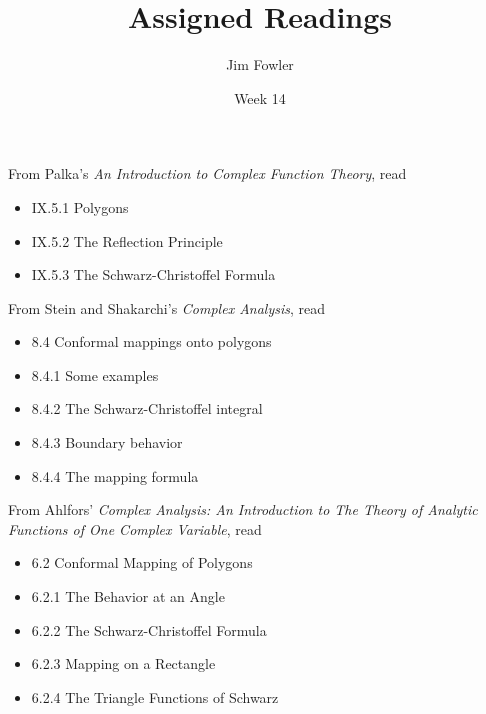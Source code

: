 \documentclass{homework}
\author{Jim Fowler}
\title{Assigned Readings}
\date{Week 14}
\begin{document}
\maketitle


From Palka's \textit{An Introduction to Complex Function Theory}, read
\begin{itemize}
\item IX.5.1 Polygons
\item IX.5.2 The Reflection Principle
\item IX.5.3 The Schwarz-Christoffel Formula
\end{itemize}

From Stein and Shakarchi's \textit{Complex Analysis}, read
\begin{itemize}
\item 8.4 Conformal mappings onto polygons
\item 8.4.1 Some examples
\item 8.4.2 The Schwarz-Christoffel integral
\item 8.4.3 Boundary behavior
\item 8.4.4 The mapping formula
\end{itemize}

From Ahlfors' \textit{Complex Analysis: An Introduction to The Theory of Analytic Functions of One Complex Variable}, read
\begin{itemize}
\item 6.2 Conformal Mapping of Polygons
\item 6.2.1 The Behavior at an Angle
\item 6.2.2 The Schwarz-Christoffel Formula
\item 6.2.3 Mapping on a Rectangle
\item 6.2.4 The Triangle Functions of Schwarz
\end{itemize}
\end{document}

